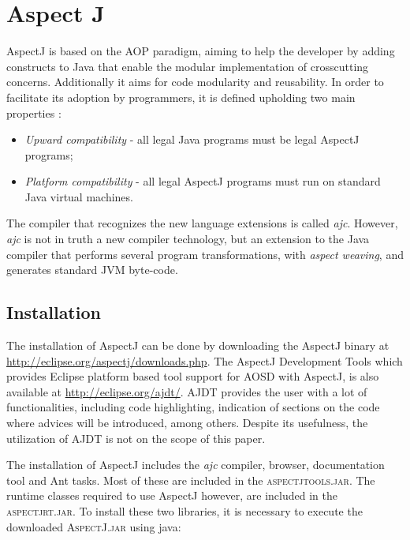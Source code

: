 \documentclass{template}
\begin{document}
\section{Aspect J}

AspectJ is based on the AOP paradigm, aiming to help the developer by adding constructs to Java that enable the modular implementation of crosscutting concerns. Additionally it aims for code modularity and reusability.
In order to facilitate its adoption by programmers, it is defined upholding two main properties \cite{Kiczales97aspect-orientedprogramming}:

\begin{itemize}
\item \textit{Upward compatibility} - all legal Java programs must be legal AspectJ programs;
\item \textit{Platform compatibility} - all legal AspectJ programs must run on standard Java virtual machines. 
\end{itemize}

The compiler that recognizes the new language extensions is called \textit{ajc}.
However, \textit{ajc} is not in truth a new compiler technology, but an extension to the Java compiler
that performs several program transformations, with \emph{aspect weaving}, and generates standard JVM byte-code.

\subsection{Installation}

The installation of AspectJ can be done by downloading the AspectJ binary at \url{http://eclipse.org/aspectj/downloads.php}. 
The AspectJ Development Tools which provides Eclipse platform based tool support for AOSD with AspectJ, is also available at \url{http://eclipse.org/ajdt/}. AJDT provides the user with a lot of functionalities, including code highlighting, indication of sections on the code where advices will be introduced, among others. Despite its usefulness, the utilization of AJDT is not on the scope of this paper.

The installation of AspectJ includes the \textit{ajc} compiler, browser, documentation tool and Ant tasks. Most of these are included in the \textsc{aspectjtools.jar}. The runtime classes required to use AspectJ however, are included in the \textsc{aspectjrt.jar}. To install these two libraries, it is necessary to execute the downloaded \textsc{AspectJ.jar} using java:
\end{document}
